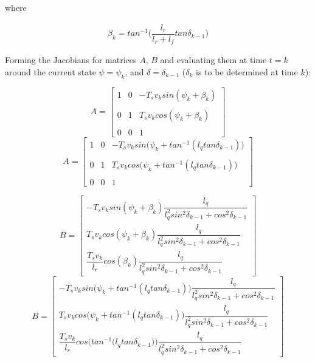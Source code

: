 where

\begin{align}
  \beta_k = tan^{-1}\Big(\dfrac{l_r}{l_r + l_f} tan\delta_{k-1}\Big)
\end{align}


Forming the Jacobians for matrices $A$, $B$ and evaluating them at time
$t=k$ around the current state $\psi = \psi_k$, and
$\delta = \delta_{k-1}$ ($\delta_k$ is to be determined at time $k$):

\begin{equation}
 A =
  \begin{bmatrix}
    1 & 0 & -T_s v_k sin(\psi_k + \beta_k) \\\\
    0 & 1 & T_s v_k cos(\psi_k + \beta_k) \\\\
    0 & 0 & 1
  \end{bmatrix}
\end{equation}
\begin{equation}
  A =
  \begin{bmatrix}
    1 & 0 & -T_s v_k sin\Big(\psi_k + tan^{-1} (l_q tan\delta_{k-1})\Big) \\\\
    0 & 1 & T_s v_k cos\Big(\psi_k + tan^{-1} (l_q tan\delta_{k-1})\Big) \\\\
    0 & 0 & 1
  \end{bmatrix}
\end{equation}


\begin{equation}
 B =
  \begin{bmatrix}
    -T_s v_k sin(\psi_k + \beta_k) \dfrac{l_q}{l_q^2 sin^2\delta_{k-1} + cos^2\delta_{k-1}} \\
    T_s v_k cos(\psi_k + \beta_k) \dfrac{l_q}{l_q^2 sin^2\delta_{k-1} + cos^2\delta_{k-1}} \\
    \dfrac{T_s v_k}{l_r} cos(\beta_k) \dfrac{l_q}{l_q^2 sin^2\delta_{k-1} + cos^2\delta_{k-1}}
  \end{bmatrix}
\end{equation}
\begin{equation}
  B =
  \begin{bmatrix}
    -T_s v_k sin\Big(\psi_k + tan^{-1} (l_q tan\delta_{k-1})\Big) \dfrac{l_q}{l_q^2 sin^2\delta_{k-1} + cos^2\delta_{k-1}} \\
    T_s v_k cos\Big(\psi_k + tan^{-1} (l_q tan\delta_{k-1})\Big) \dfrac{l_q}{l_q^2 sin^2\delta_{k-1} + cos^2\delta_{k-1}} \\
    \dfrac{T_s v_k}{l_r} cos\Bigg(tan^{-1} \Big(l_q tan\delta_{k-1}\Big)\Bigg) \dfrac{l_q}{l_q^2 sin^2\delta_{k-1} + cos^2\delta_{k-1}}
  \end{bmatrix}
\end{equation}


